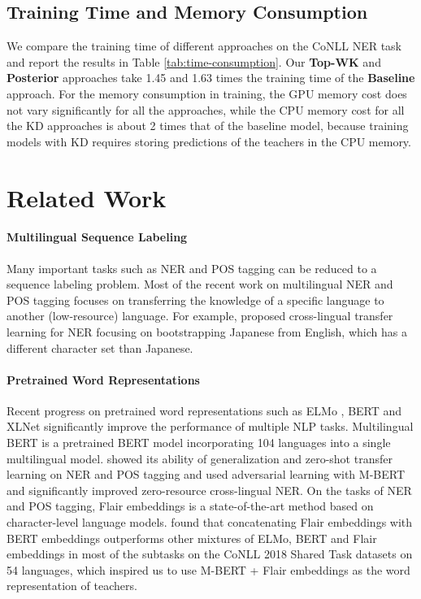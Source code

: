 \documentclass[11pt,a4paper]{article}
\begin{document}
\subsection{Training Time and Memory Consumption}
We compare the training time of different approaches on the CoNLL NER task and report the results in Table \ref{tab:time-consumption}. Our \textbf{Top-WK} and \textbf{Posterior} approaches take 1.45 and 1.63 times the training time of the \textbf{Baseline} approach. For the memory consumption in training, the GPU memory cost does not vary significantly for all the approaches, while the CPU memory cost for all the KD approaches is about 2 times that of the baseline model, because training models with KD requires storing predictions of the teachers in the CPU memory.


\section{Related Work}
\paragraph{Multilingual Sequence Labeling} Many important tasks such as NER and POS tagging can be reduced to a sequence labeling problem. Most of the recent work on multilingual NER \cite{tackstrom-2012-nudging,fang-etal-2017-learning,enghoff-etal-2018-low,rahimi-etal-2019-massively,johnson-etal-2019-cross} and POS tagging \cite{snyder-etal-2009-adding,plank-agic-2018-distant} focuses on transferring the knowledge of a specific language to another (low-resource) language. For example, \citet{johnson-etal-2019-cross} proposed cross-lingual transfer learning for NER focusing on bootstrapping Japanese from English, which has a different character set than Japanese.

\paragraph{Pretrained Word Representations}
Recent progress on pretrained word representations such as ELMo \cite{peters-etal-2018-deep}, BERT \cite{devlin-etal-2019-bert} and XLNet \cite{NIPS2019_8812} significantly improve the performance of multiple NLP tasks. Multilingual BERT is a pretrained BERT model incorporating 104 languages into a single multilingual model. \citet{pires-etal-2019-multilingual} showed its ability of generalization and zero-shot transfer learning on NER and POS tagging and \citet{keung-etal-2019-adversarial} used adversarial learning with M-BERT and significantly improved zero-resource cross-lingual NER. On the tasks of NER and POS tagging, Flair embeddings \cite{akbik-etal-2018-contextual,akbik-etal-2019-pooled} is a state-of-the-art method based on character-level language models. \citet{straka2019evaluating} found that concatenating Flair embeddings with BERT embeddings outperforms other mixtures of ELMo, BERT and Flair embeddings in most of the subtasks on the CoNLL 2018 Shared Task \cite{zeman-shared-2018-conll} datasets on 54 languages, which inspired us to use M-BERT + Flair embeddings as the word representation of teachers.
\end{document}

